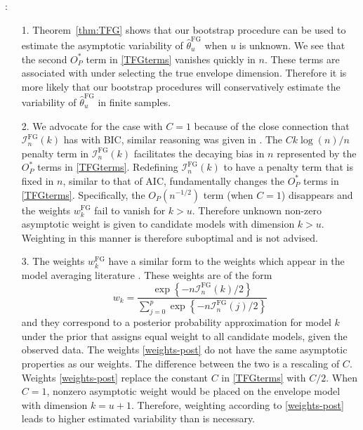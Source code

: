 \documentclass{article}\usepackage[]{graphicx}\usepackage[]{color}
\newcommand{\TFG}{\widehat{\theta}^{\text{FG}}}
\newcommand{\IFG}{\mathcal{I}_n^{\text{FG}}}
\newcommand{\wFG}{w^{\text{FG}}}
\begin{document}
: 

\begin{itemize}
\item[1.] Theorem~\ref{thm:TFG} shows that our bootstrap procedure can be used to estimate the asymptotic variability of $\TFG_u$ when $u$ is unknown. We see that the second $O_P^{\textstyle{*}}$ term in \eqref{TFGterms} vanishes quickly in $n$. These terms are associated with under selecting the true envelope dimension. Therefore it is more likely that our bootstrap procedures will conservatively estimate the variability of $\TFG_u$ in finite samples.
\item[2.] We advocate for the case with $C = 1$ because of the close connection that $\IFG(k)$ has with \textsc{BIC}, similar reasoning was given in \citet{zhangmai}. The $Ck\log(n)/n$ penalty term in $\IFG(k)$ facilitates the decaying bias in $n$ represented by the $O_P^{\textstyle{*}}$ terms in \eqref{TFGterms}. Redefining $\IFG(k)$ to have a penalty term that is fixed in $n$, similar to that of \textsc{AIC}, fundamentally changes the $O_P^{\textstyle{*}}$ terms in \eqref{TFGterms}. Specifically, the $O_P(n^{-1/2})$ term (when $C = 1$) disappears and the weights $\wFG_k$ fail to vanish for $k > u$. Therefore unknown non-zero asymptotic weight is given to candidate models with dimension $k > u$. Weighting in this manner is therefore suboptimal and is not advised.
\item[3.] The weights $\wFG_k$ have a similar form to the weights which appear in the model averaging literature \citep{buckland, burnham, hjort, claeskens, tsague}. These weights are of the form
\begin{equation} \label{weights-post}
  w_k = \frac{\exp\left\{-n\IFG(k)/2\right\}}
    {\sum_{j=0}^p\exp\left\{-n\IFG(j)/2\right\}}
\end{equation}
and they correspond to a posterior probability approximation for model $k$ under the prior that assigns equal weight to all candidate models, given the observed data. The weights \eqref{weights-post} do not have the same asymptotic properties as our weights. The difference between the two is a rescaling of $C$. Weights \eqref{weights-post} replace the constant $C$ in \eqref{TFGterms} with $C/2$. When $C = 1$, nonzero asymptotic weight would be placed on the envelope model with dimension $k = u + 1$. Therefore, weighting according to \eqref{weights-post} leads to higher estimated variability than is necessary.
\end{itemize}
\end{document}
